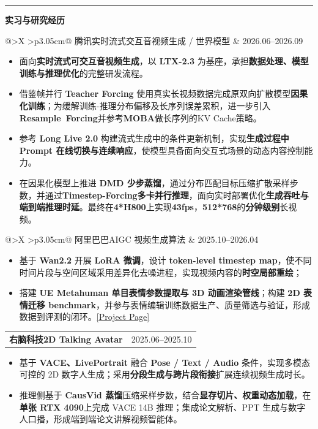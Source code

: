 \documentclass[10pt,a4paper]{ctexart}
\makeatletter
\newcommand{\sectiontitle}[2]{%
  \vspace{0.46em}
  {\color{teal}\rule{2.2pt}{1.10em}}\hspace{0.48em}%
  {\sffamily\color{navy}\fontsize{12.7}{14}\selectfont\bfseries #1}%
  \hspace{0.62em}{\sffamily\color{muted}\fontsize{7.1}{8}\selectfont\MakeUppercase{#2}}\par
  \vspace{0.13em}{\color{rulegray}\rule{\linewidth}{0.55pt}}\vspace{0.15em}
}
\newcommand{\entryhead}[3]{%
  \begin{tabularx}{\linewidth}{@{}>{\sffamily\bfseries\color{navy}}X >{\sffamily\raggedleft\arraybackslash\color{muted}}p{3.05cm}@{}}
    #1\quad{\color{teal}\textbar}\quad #2 & #3
  \end{tabularx}\vspace{0.08em}
}
\newenvironment{tightitems}{%
  \begin{itemize}[leftmargin=1.20em,itemsep=0.05em,topsep=0.05em,parsep=0pt,partopsep=0pt,label=\textcolor{teal}{\raisebox{0.15ex}{\scriptsize\textbullet}}]
}{\end{itemize}\vspace{0.07em}}
\makeatother
\begin{document}
\sectiontitle{实习与研究经历}{Research Experience}

\entryhead{腾讯}{实时流式交互音视频生成 / 世界模型}{2026.06--2026.09}
\begin{tightitems}
  \item 面向\textbf{实时流式可交互音视频生成}，以 \textbf{LTX-2.3} 为基座，承担\textbf{数据处理、模型训练与推理优化}的完整研发流程。
  \item 借鉴帧并行 \textbf{Teacher Forcing} 使用真实长视频数据完成原双向扩散模型\textbf{因果化训练}；为缓解训练-推理分布偏移及长序列误差累积，进一步引入 \mbox{\textbf{Resample Forcing}}并参考\textbf{MOBA}做长序列的KV Cache策略。
  \item 参考 \textbf{Long Live 2.0} 构建流式生成中的条件更新机制，实现\textbf{生成过程中 Prompt 在线切换与连续响应}，使模型具备面向交互式场景的动态内容控制能力。
  \item 在因果化模型上推进 \textbf{DMD 少步蒸馏}，通过分布匹配目标压缩扩散采样步数，并通过\textbf{Timestep-Forcing多卡并行推理}，面向实时部署优化\textbf{生成吞吐与端到端推理时延}。最终在\textbf{4*H800}上实现\textbf{43fps}，\textbf{512*768}的\textbf{分钟级别}长视频。
\end{tightitems}

\entryhead{阿里巴巴}{AIGC 视频生成算法}{2025.10--2026.04}
\begin{tightitems}
  \item 基于 \textbf{Wan2.2} 开展 \textbf{LoRA 微调}，设计 \textbf{token-level timestep map}，使不同时间片段与空间区域采用差异化去噪进程，实现视频内容的\textbf{时空局部重绘}；
  \item 搭建 \textbf{UE Metahuman 单目表情参数提取与 3D 动画渲染管线}；构建 \textbf{2D 表情迁移 benchmark}，并参与表情编辑训练数据生产、质量筛选与验证，形成数据到评测的闭环。\href{https://youku-aigc.github.io/PerformRecast/}{[Project Page]}
\end{tightitems}

\entryhead{右脑科技}{2D Talking Avatar}{2025.06--2025.10}
\begin{tightitems}
  \item 基于 \textbf{VACE、LivePortrait} 融合 \textbf{Pose / Text / Audio} 条件，实现多模态可控的 2D 数字人生成；采用\textbf{分段生成与跨片段衔接}扩展连续视频生成时长。
  \item 推理侧基于 \textbf{CausVid 蒸馏}压缩采样步数，结合\textbf{显存切片、权重动态加载}，在\textbf{单张 RTX 4090}上完成 VACE 14B 推理；集成论文解析、PPT 生成与数字人口播，形成端到端论文讲解视频智能体。
\end{tightitems}
\end{document}
